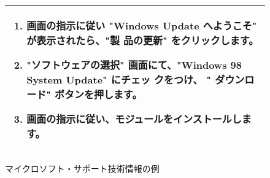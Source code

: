 \begin{figure}
\begin{center}
\begin{tabular}{|p{12cm}|}
\begin{enumerate}
     \item 画面の指示に従い "Windows Update へようこそ" が表示されたら、"製
	   品の更新" をクリックします。
     \item "ソフトウェアの選択" 画面にて、"Windows 98 System Update" にチェッ
	   クをつけ、 " ダウンロード" ボタンを押します。
     \item 画面の指示に従い、モジュールをインストールします。
    \end{enumerate}
    \\
    \hline
   \end{tabular}
   \caption{マイクロソフト・サポート技術情報の例}
   \label{fig:マイクロソフト・サポート技術情報の例}
  \end{center}
\end{figure}



